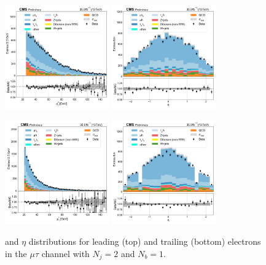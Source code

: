 \begin{figure}[htb!]
    \centering
    \includegraphics[width=0.4\textwidth]{chapters/Analysis/sectionPlots/figures/data_mc_overlays/mutau_2016_cat_eq2_eq1_signal_linear_lepton_lepton1_pt}
    \includegraphics[width=0.4\textwidth]{chapters/Analysis/sectionPlots/figures/data_mc_overlays/mutau_2016_cat_eq2_eq1_signal_linear_lepton_lepton1_eta}

    \includegraphics[width=0.4\textwidth]{chapters/Analysis/sectionPlots/figures/data_mc_overlays/mutau_2016_cat_eq2_eq1_signal_linear_lepton_lepton2_pt}
    \includegraphics[width=0.4\textwidth]{chapters/Analysis/sectionPlots/figures/data_mc_overlays/mutau_2016_cat_eq2_eq1_signal_linear_lepton_lepton2_eta}
    \caption{\pt and $\eta$ distributions for leading (top) and trailing
        (bottom) electrons in the $\mu\tau$ channel with $N_{j} = 2$ and
        $N_{b} = 1$.}
    \label{fig:analysis:plots:mutau_5_kinematic}
\end{figure}

